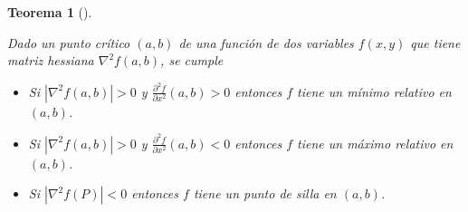 \documentclass[
  a4paper,
]{scrreport}
\providecommand{\tightlist}{%
  \setlength{\itemsep}{0pt}\setlength{\parskip}{0pt}}\usepackage{longtable,booktabs,array}
\theoremstyle{plain}
\newtheorem{theorem}{Teorema}[chapter]
\theoremstyle{definition}
\theoremstyle{plain}
\theoremstyle{plain}
\theoremstyle{definition}
\theoremstyle{definition}
\theoremstyle{remark}
\begin{document}
\begin{theorem}[]\protect\hypertarget{thm-extremos-funcion-dos-variables}{}\label{thm-extremos-funcion-dos-variables}

Dado un punto crítico \((a, b)\) de una función de dos variables
\(f(x,y)\) que tiene matriz hessiana \(\nabla^2f(a,b)\), se cumple

\begin{itemize}
\tightlist
\item
  Si \(|\nabla^2 f(a,b)|>0\) y
  \(\frac{\partial^2 f}{\partial x^2}(a,b)>0\) entonces \(f\) tiene un
  \emph{mínimo relativo} en \((a,b)\).
\item
  Si \(|\nabla^2 f(a,b)|>0\) y
  \(\frac{\partial^2 f}{\partial x^2}(a,b)<0\) entonces \(f\) tiene un
  \emph{máximo relativo} en \((a,b)\).
\item
  Si \(|\nabla^2 f(P)|<0\) entonces \(f\) tiene un \emph{punto de silla}
  en \((a,b)\).
\end{itemize}

\end{theorem}
\end{document}
